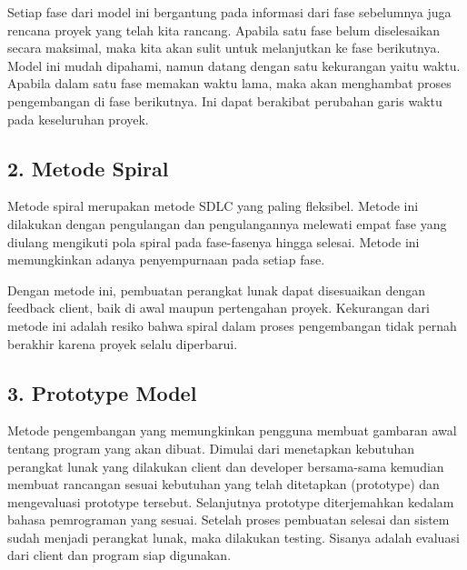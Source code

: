 \documentclass{article}
\begin{document}
\begin{multicols*}{2}
    Setiap fase dari model ini bergantung pada informasi dari fase sebelumnya
    juga rencana proyek yang telah kita rancang. Apabila satu fase belum 
    diselesaikan secara maksimal, maka kita akan sulit untuk melanjutkan
    ke fase berikutnya. Model ini mudah dipahami, namun datang dengan 
    satu kekurangan yaitu waktu.
    Apabila dalam satu fase memakan waktu lama, maka akan menghambat
    proses pengembangan di fase berikutnya. Ini dapat berakibat
    perubahan garis waktu pada keseluruhan proyek.

    \subsection*{2. Metode Spiral}
    Metode spiral merupakan metode SDLC yang paling 
    fleksibel. Metode ini dilakukan dengan pengulangan 
    dan pengulangannya melewati empat fase yang diulang 
    mengikuti pola spiral pada fase-fasenya hingga 
    selesai. Metode ini memungkinkan adanya penyempurnaan 
    pada setiap fase.

    Dengan metode ini, pembuatan perangkat lunak dapat 
    disesuaikan dengan feedback client, baik di awal 
    maupun pertengahan proyek.
    Kekurangan dari metode ini adalah resiko bahwa
    spiral dalam proses pengembangan tidak pernah 
    berakhir karena proyek selalu diperbarui.

    \subsection*{3. Prototype Model}
    Metode pengembangan yang memungkinkan pengguna
    membuat gambaran awal tentang program yang akan dibuat.
    Dimulai dari menetapkan kebutuhan perangkat lunak yang 
    dilakukan client dan developer bersama-sama 
    kemudian membuat rancangan sesuai kebutuhan yang telah
    ditetapkan (prototype) dan mengevaluasi prototype tersebut.
    Selanjutnya prototype diterjemahkan kedalam bahasa
    pemrograman yang sesuai. Setelah proses pembuatan selesai
    dan sistem sudah menjadi perangkat lunak, maka dilakukan
    testing. Sisanya adalah evaluasi dari client 
    dan program siap digunakan.
        
    \end{multicols*}
\end{document}
